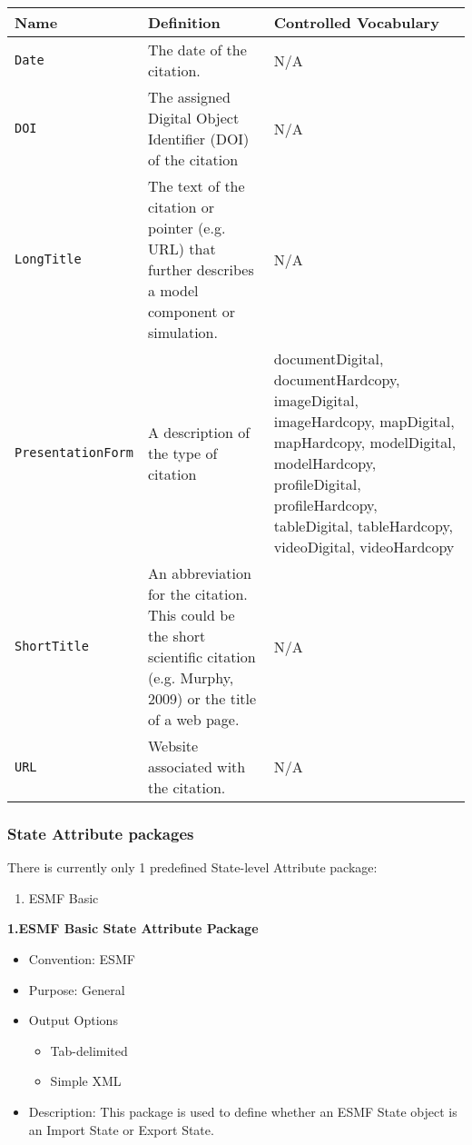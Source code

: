 \begin{tabular}{|p{8cm}|p{20cm}|p{10cm}|}
     {\bf Name } & {\bf Definition} & {\bf Controlled Vocabulary} \\
     \hline\hline
     {\tt Date} & The date of the citation. & N/A\\
     {\tt DOI} & The assigned Digital Object Identifier (DOI) of the citation & N/A\\
     {\tt LongTitle} & The text of the citation or pointer (e.g. URL) that further describes a model component or simulation. & N/A\\
     {\tt PresentationForm} & A description of the type of citation & documentDigital, documentHardcopy, imageDigital, imageHardcopy, mapDigital, mapHardcopy, modelDigital, modelHardcopy, profileDigital, profileHardcopy, tableDigital, tableHardcopy, videoDigital, videoHardcopy\\
     {\tt ShortTitle} & An abbreviation for the citation.  This could be the short scientific citation (e.g. Murphy, 2009) or the title of a web page. & N/A \\     {\tt URL} & Website associated with the citation. & N/A\\
\end{tabular}



\vspace{.20in}
\subsubsection{State Attribute packages}
\label{StateAttributePackages}

There is currently only 1 predefined State-level Attribute package:

\begin{enumerate}
    \item ESMF Basic
\end{enumerate}



\vspace{.20in}
{\bf 1.ESMF Basic State Attribute Package}

\begin{itemize}
    \item Convention: ESMF
    \item Purpose: General
    \item Output Options
    \begin{itemize}
        \item Tab-delimited
        \item Simple XML 
    \end{itemize}
    \item Description: This package is used to define whether an ESMF State object is an Import State or Export State.   
\end{itemize}

